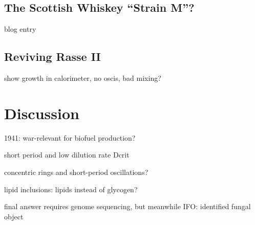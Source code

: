 \documentclass[11pt,a4paper,english]{article}
\begin{document}
\subsection{The Scottish Whiskey ``Strain M''?}

blog entry

\subsection{Reviving Rasse II}

show growth in calorimeter, no oscis, bad mixing?

\section{Discussion}

1941: war-relevant for biofuel production?

short period and low dilution rate Dcrit

concentric rings and short-period oscillations?

lipid inclusions: lipids instead of glycogen?

final answer requires genome sequencing, but meanwhile
IFO: identified fungal object




\end{document}
